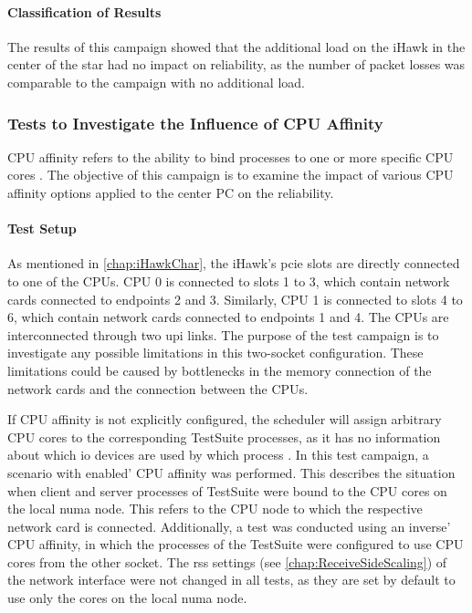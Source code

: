 \paragraph{Classification of Results}
The results of this campaign showed that the additional load on the iHawk in the center of the star had no impact on reliability, as the number of packet losses was comparable to the campaign with no additional load.


\subsubsection{Tests to Investigate the Influence of CPU Affinity} \label{chap:AffinityAnalysis}
\ac{CPU} affinity refers to the ability to bind processes to one or more specific \ac{CPU} cores \cite{reli06}. The objective of this campaign is to examine the impact of various \ac{CPU} affinity options applied to the center PC on the reliability.

\paragraph{Test Setup}
As mentioned in \ref{chap:iHawkChar}, the iHawk's \ac{pcie} slots are directly connected to one of the \ac{CPU}s. \ac{CPU} 0 is connected to slots 1 to 3, which contain network cards connected to endpoints 2 and 3. Similarly, \ac{CPU} 1 is connected to slots 4 to 6, which contain network cards connected to endpoints 1 and 4. The \ac{CPU}s are interconnected through two \ac{upi} links. The purpose of the test campaign is to investigate any possible limitations in this two-socket configuration. These limitations could be caused by bottlenecks in the memory connection of the network cards and the connection between the \ac{CPU}s.

If \ac{CPU} affinity is not explicitly configured, the scheduler will assign arbitrary \ac{CPU} cores to the corresponding TestSuite processes, as it has no information about which \ac{io} devices are used by which process \cite{reli07}. In this test campaign, a scenario with enabled' \ac{CPU} affinity was performed. This describes the situation when client and server processes of TestSuite were bound to the \ac{CPU} cores on the local \ac{numa} node. This refers to the \ac{CPU} node to which the respective network card is connected. Additionally, a test was conducted using an inverse' \ac{CPU} affinity, in which the processes of the TestSuite were configured to use \ac{CPU} cores from the other socket. The \ac{rss} settings (see \ref{chap:ReceiveSideScaling}) of the network interface were not changed in all tests, as they are set by default to use only the cores on the local \ac{numa} node.

